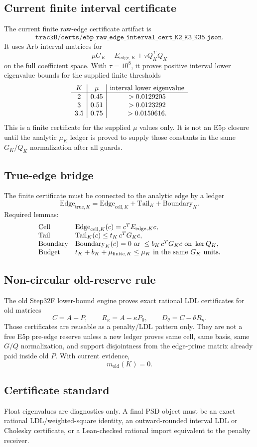 \subsection{Current finite interval certificate}

The current finite raw-edge certificate artifact is
\[
  \texttt{trackB/certs/e5p\_raw\_edge\_interval\_cert\_K2\_K3\_K35.json}.
\]
It uses Arb interval matrices for
\[
  \mu G_K - E_{\mathrm{edge},K}+\tau Q_K^TQ_K
\]
on the full coefficient space.  With \(\tau=10^8\), it proves positive
interval lower eigenvalue bounds for the supplied finite thresholds
\[
\begin{array}{c|c|c}
K & \mu & \hbox{interval lower eigenvalue} \\
\hline
2 & 0.45 & >0.0129205\\
3 & 0.51 & >0.0123292\\
3.5 & 0.75 & >0.0150616.
\end{array}
\]
This is a finite certificate for the supplied \(\mu\) values only.  It is not
an E5p closure until the analytic \(\mu_K\) ledger is proved to supply those
constants in the same \(G_K/Q_K\) normalization after all guards.

\subsection{True-edge bridge}

The finite certificate must be connected to the analytic edge by a ledger
\[
  \mathrm{Edge}_{\mathrm{true},K}
  = \mathrm{Edge}_{\mathrm{cell},K}
    + \mathrm{Tail}_K
    + \mathrm{Boundary}_K.
\]
Required lemmas:
\[
\begin{array}{lll}
\mathrm{Cell} & \mathrm{Edge}_{\mathrm{cell},K}(c)=c^TE_{\mathrm{edge},K}c, \\
\mathrm{Tail} & \mathrm{Tail}_K(c)\le t_K\,c^TG_Kc, \\
\mathrm{Boundary} & \mathrm{Boundary}_K(c)=0 \hbox{ or } \le b_K\,c^TG_Kc
  \hbox{ on }\ker Q_K, \\
\mathrm{Budget} & t_K+b_K+\mu_{\mathrm{finite},K}\le\mu_K
  \hbox{ in the same }G_K\hbox{ units.}
\end{array}
\]

\subsection{Non-circular old-reserve rule}

The old Step32F lower-bound engine proves exact rational LDL certificates for
old matrices
\[
  C=A-P,\qquad R_\kappa=A-\kappa P_0,\qquad
  D_\theta=C-\theta R_\kappa.
\]
Those certificates are reusable as a penalty/LDL pattern only.  They are not a
free E5p pre-edge reserve unless a new ledger proves same cell, same basis,
same \(G/Q\) normalization, and support disjointness from the edge-prime
matrix already paid inside old \(P\).  With current evidence,
\[
  m_{\mathrm{old}}(K)=0.
\]

\subsection{Certificate standard}

Float eigenvalues are diagnostics only.  A final PSD object must be an exact
rational LDL/weighted-square identity, an outward-rounded interval LDL or
Cholesky certificate, or a Lean-checked rational import equivalent to the
penalty receiver.
